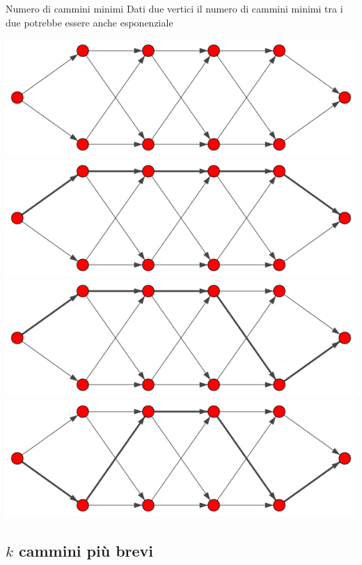 \documentclass{beamer}
\theoremstyle{plain}
\theoremstyle{definition}
\theoremstyle{remark}
\begin{document}
\begin{frame}{Numero di cammini minimi}
  Dati due vertici il numero di cammini minimi tra i due potrebbe
  essere anche esponenziale
  \vfill

  \begin{overprint}
      \includegraphics[width=\textwidth]{catena0}
      \includegraphics[width=\textwidth]{catena1}
      \includegraphics[width=\textwidth]{catena2}
      \includegraphics[width=\textwidth]{catena3}
  \end{overprint}
\end{frame}


\subsection{$k$ cammini pi\`u brevi}
\end{document}
